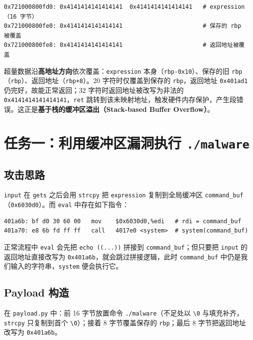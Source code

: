 \documentclass[11pt,a4paper]{article}
\begin{document}
\begin{lstlisting}
0x721000800fd0: 0x4141414141414141  0x4141414141414141   # expression（16 字节）
0x721000800fe0: 0x4141414141414141                       # 保存的 rbp 被覆盖
0x721000800fe8: 0x4141414141414141                       # 返回地址被覆盖
\end{lstlisting}

超量数据沿\textbf{高地址方向}依次覆盖：\texttt{expression} 本身（\texttt{rbp-0x10}）、保存的旧 \texttt{rbp}（\texttt{rbp}）、返回地址（\texttt{rbp+8}）。20 字符时仅覆盖到保存的 \texttt{rbp}，返回地址 \texttt{0x401ad1} 仍完好，故能正常返回；32 字符时返回地址被改写为非法的 \texttt{0x4141414141414141}，\texttt{ret} 跳转到该未映射地址，触发硬件内存保护，产生段错误。这正是\textbf{基于栈的缓冲区溢出（Stack-based Buffer Overflow）}。

\section{任务一：利用缓冲区漏洞执行 \texttt{./malware}}

\subsection{攻击思路}

\texttt{input} 在 \texttt{gets} 之后会用 \texttt{strcpy} 把 \texttt{expression} 复制到全局缓冲区 \texttt{command\_buf}（\texttt{0x6030d0}）。而 \texttt{eval} 中存在如下指令：

\begin{lstlisting}[language=myasm]
401a6b: bf d0 30 60 00   mov    $0x6030d0,%edi   # rdi = command_buf
401a70: e8 6b fd ff ff   call   4017e0 <system>  # system(command_buf)
\end{lstlisting}

正常流程中 \texttt{eval} 会先把 \texttt{echo ((...))} 拼接到 \texttt{command\_buf}；但只要把 \texttt{input} 的返回地址直接改写为 \texttt{0x401a6b}，就会跳过拼接逻辑，此时 \texttt{command\_buf} 中仍是我们输入的字符串，\texttt{system} 便会执行它。

\subsection{Payload 构造}

在 \texttt{payload.py} 中：前 16 字节放置命令 \texttt{./malware}（不足处以 \texttt{\textbackslash 0} 与填充补齐，\texttt{strcpy} 只复制到首个 \texttt{\textbackslash 0}）；接着 8 字节覆盖保存的 \texttt{rbp}；最后 8 字节把返回地址改写为 \texttt{0x401a6b}。
\end{document}
